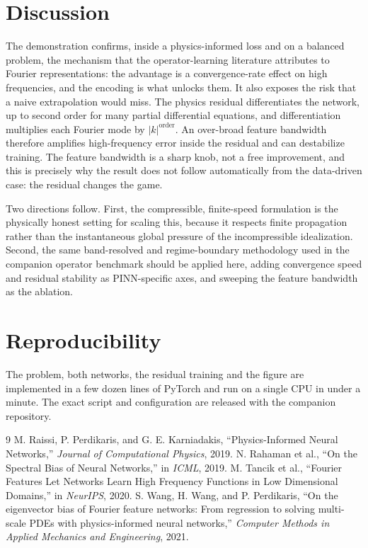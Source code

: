 \documentclass[conference]{IEEEtran}
\begin{document}
\section{Discussion}
The demonstration confirms, inside a physics-informed loss and on a balanced problem, the mechanism that the operator-learning literature attributes to Fourier representations: the advantage is a convergence-rate effect on high frequencies, and the encoding is what unlocks them. It also exposes the risk that a naive extrapolation would miss. The physics residual differentiates the network, up to second order for many partial differential equations, and differentiation multiplies each Fourier mode by $|k|^{\mathrm{order}}$. An over-broad feature bandwidth therefore amplifies high-frequency error inside the residual and can destabilize training. The feature bandwidth is a sharp knob, not a free improvement, and this is precisely why the result does not follow automatically from the data-driven case: the residual changes the game.

Two directions follow. First, the compressible, finite-speed formulation is the physically honest setting for scaling this, because it respects finite propagation rather than the instantaneous global pressure of the incompressible idealization. Second, the same band-resolved and regime-boundary methodology used in the companion operator benchmark should be applied here, adding convergence speed and residual stability as PINN-specific axes, and sweeping the feature bandwidth as the ablation.

\section{Reproducibility}
The problem, both networks, the residual training and the figure are implemented in a few dozen lines of PyTorch and run on a single CPU in under a minute. The exact script and configuration are released with the companion repository.

\begin{thebibliography}{9}
 M. Raissi, P. Perdikaris, and G. E. Karniadakis, ``Physics-Informed Neural Networks,'' \emph{Journal of Computational Physics}, 2019.
 N. Rahaman et al., ``On the Spectral Bias of Neural Networks,'' in \emph{ICML}, 2019.
 M. Tancik et al., ``Fourier Features Let Networks Learn High Frequency Functions in Low Dimensional Domains,'' in \emph{NeurIPS}, 2020.
 S. Wang, H. Wang, and P. Perdikaris, ``On the eigenvector bias of Fourier feature networks: From regression to solving multi-scale PDEs with physics-informed neural networks,'' \emph{Computer Methods in Applied Mechanics and Engineering}, 2021.
\end{thebibliography}
\end{document}
